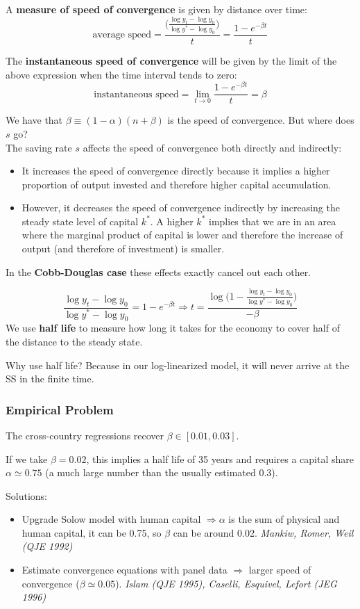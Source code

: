 A \textbf{measure of speed of convergence} is given by distance over time: \[
    \text{average speed} = \frac{\Big(\frac{\log y_t - \log y_0}{\log y^*-\log y_0}\Big)}{t} = \frac{1-e^{-\beta t}}{t}
\]

The \textbf{instantaneous speed of convergence} will be given by the limit of the above expression when the time interval tends to zero: \[
    \text{instantaneous speed} = \lim_{t \to 0}\frac{1-e^{-\beta t}}{t}= \beta
\]

We have that $\beta \equiv (1-\alpha)(n+\beta)$ is the speed of convergence. But where does $s$ go? \\
The saving rate $s$ affects the speed of convergence both directly and indirectly: \begin{itemize}
    \item It increases the speed of convergence directly because it implies a higher proportion of output invested and therefore higher capital accumulation.
    \item However, it decreases the speed of convergence indirectly by increasing the steady state level of capital $k^*$. A higher $k^*$ implies that we are in an area where the marginal product of capital is lower and therefore the increase of output (and therefore of investment) is smaller.
\end{itemize}
In the \textbf{Cobb-Douglas case} these effects exactly cancel out each other.

\[
    \frac{\log y_t - \log y_0}{\log y^*-\log y_0} = 1-e^{-\beta t} \Longrightarrow t=\frac{\log\Big(1-\frac{\log y_t - \log y_0}{\log y^* - \log y_0}\Big)}{-\beta}
\]
We use \textbf{half life} to measure how long it takes for the economy to cover half of the distance to the steady state.
\begin{remark*}
    Why use half life? Because in our log-linearized model, it will never arrive at the SS in the finite time.
\end{remark*}


\subsubsection{Empirical Problem}
The cross-country regressions recover $\beta \in [0.01, 0.03]$.

If we take $\beta = 0.02$, this implies a half life of 35 years and requires a capital share $\alpha \simeq 0.75$ (a much large number than the usually estimated $0.3$).

Solutions: \begin{itemize}
    \item Upgrade Solow model with human capital $\Rightarrow \alpha$ is the sum of physical and human capital, it can be 0.75, so $\beta$ can be around 0.02. \textit{Mankiw, Romer, Weil (QJE 1992)}
    \item Estimate convergence equations with panel data $\Rightarrow$ larger speed of convergence ($\beta \simeq 0.05$). \textit{Islam (QJE 1995), Caselli, Esquivel, Lefort (JEG 1996)}
\end{itemize}

